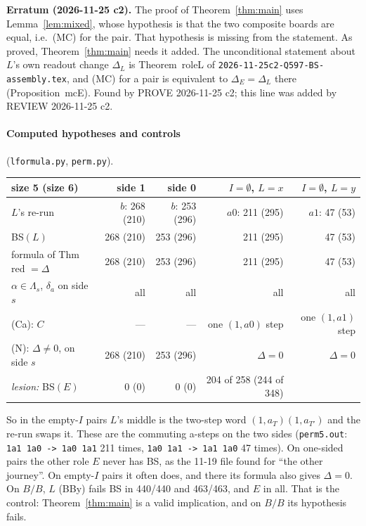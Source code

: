 \documentclass[11pt]{article}
\theoremstyle{definition}\newtheorem{definition}[theorem]{Definition}\newtheorem{remark}[theorem]{Remark}
\begin{document}
\noindent\textbf{Erratum (2026-11-25 c2).} The proof of Theorem~\ref{thm:main} uses Lemma~\ref{lem:mixed}, whose hypothesis is that the two composite boards are equal, i.e.\ (MC) for the pair. That hypothesis is missing from the statement. As proved, Theorem~\ref{thm:main} needs it added. The unconditional statement about $L$'s own readout change $\Delta_L$ is Theorem~roleL of \texttt{2026-11-25c2-Q597-BS-assembly.tex}, and (MC) for a pair is equivalent to $\Delta_E=\Delta_L$ there (Proposition~mcE). Found by PROVE 2026-11-25 c2; this line was added by REVIEW 2026-11-25 c2.

\paragraph{Computed hypotheses and controls} (\texttt{lformula.py}, \texttt{perm.py}).
\begin{center}\small\begin{tabular}{lrrrr}\toprule
size 5 (size 6) & side 1 & side 0 & $I=\emptyset$, $L=x$ & $I=\emptyset$, $L=y$\\\midrule
$L$'s re-run & $b$: 268 (210) & $b$: 253 (296) & $a0$: 211 (295) & $a1$: 47 (53)\\
BS$(L)$ & 268 (210) & 253 (296) & 211 (295) & 47 (53)\\
formula of Thm red $=\Delta$ & 268 (210) & 253 (296) & 211 (295) & 47 (53)\\
$\alpha\in\Lambda_s$, $\delta_a$ on side $s$ & all & all & all & all\\
(Ca): $C$ & --- & --- & one $(1,a0)$ step & one $(1,a1)$ step\\
(N): $\Delta\ne0$, on side $s$ & 268 (210) & 253 (296) & $\Delta=0$ & $\Delta=0$\\
\midrule
\emph{lesion:} BS$(E)$ & 0 (0) & 0 (0) & 204 of 258 (244 of 348) & \\
\bottomrule\end{tabular}\end{center}
So in the empty-$I$ pairs $L$'s middle is the two-step word $(1,a_T)(1,a_{T'})$ and the re-run swaps it. These are the commuting a-steps on the two sides (\texttt{perm5.out}: \texttt{1a1 1a0 -> 1a0 1a1} 211 times, \texttt{1a0 1a1 -> 1a1 1a0} 47 times). On one-sided pairs the other role $E$ never has BS, as the 11-19 file found for ``the other journey''. On empty-$I$ pairs it often does, and there its formula also gives $\Delta=0$. On $B/B$, $L$ (BBy) fails BS in 440/440 and 463/463, and $E$ in all. That is the control: Theorem~\ref{thm:main} is a valid implication, and on $B/B$ its hypothesis fails.
\end{document}
